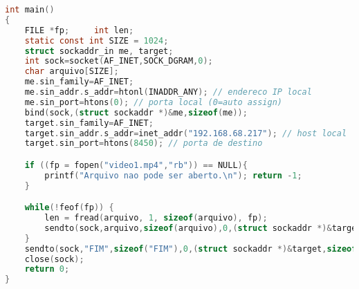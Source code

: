 \lstset{caption=Exemplo de aplicação servidora, label=list:server}
\begin{lstlisting}[language=C]
int main()
{ 
    FILE *fp;     int len;     
    static const int SIZE = 1024;
    struct sockaddr_in me, target;
    int sock=socket(AF_INET,SOCK_DGRAM,0);
    char arquivo[SIZE];
    me.sin_family=AF_INET;
    me.sin_addr.s_addr=htonl(INADDR_ANY); // endereco IP local 
    me.sin_port=htons(0); // porta local (0=auto assign)
    bind(sock,(struct sockaddr *)&me,sizeof(me));
    target.sin_family=AF_INET;
    target.sin_addr.s_addr=inet_addr("192.168.68.217"); // host local 
    target.sin_port=htons(8450); // porta de destino 

    if ((fp = fopen("video1.mp4","rb")) == NULL){
        printf("Arquivo nao pode ser aberto.\n"); return -1;
    }

    while(!feof(fp)) {
        len = fread(arquivo, 1, sizeof(arquivo), fp);
        sendto(sock,arquivo,sizeof(arquivo),0,(struct sockaddr *)&target,sizeof(target));
    }
    sendto(sock,"FIM",sizeof("FIM"),0,(struct sockaddr *)&target,sizeof(target));
    close(sock);
    return 0;
}
\end{lstlisting}
